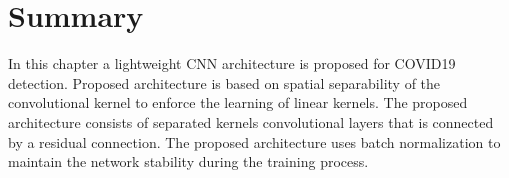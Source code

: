 \section{Summary}
In this chapter a lightweight CNN architecture is proposed for COVID19 detection. Proposed architecture is based on spatial separability of the convolutional kernel to enforce the learning of linear kernels. The proposed architecture consists of separated kernels convolutional layers that is connected by a residual connection. The proposed architecture uses batch normalization to maintain the network stability during the training process.
